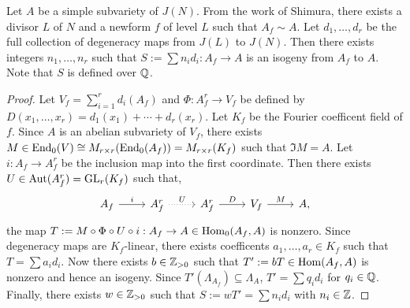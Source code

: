 \documentclass{article}
\begin{document}
\begin{proposition}
    \label{integral_degen}
    Let $A$ be a simple subvariety of $J(N)$. From the work of Shimura,
    there exists a divisor $L$ of $N$ and a newform $f$ of level $L$ such that
    $A_f \sim A$. Let $d_1,\ldots,d_r$ be the full collection of degeneracy
    maps from $J(L)$ to $J(N)$. Then there exists integers $n_1,\ldots,n_r$
    such that $S:=\sum n_i d_i: A_f\to A$ is an isogeny from $A_f$ to $A$. Note
    that $S$ is defined over $\mathbb{Q}$.
\end{proposition}
\begin{proof}
    Let $V_f=\sum_{i=1} ^r d_i(A_f)$ and $\Phi:A_f ^r \to V_f$ be defined by
    $D(x_1,\ldots,x_r) = d_1(x_1)+\cdots+d_r(x_r)$. Let $K_f$ be the Fourier
    coefficent field of $f$. Since $A$ is an abelian subvariety of $V_f$, there
    exists $M\in \operatorname{End}_0(V)\cong M_{r\times r} (\operatorname{End}_0(A_f)) = M_{r\times r}
    (K_f)$ such that $\Im M = A$. Let $i:A_f\to A_f ^r$ be the inclusion map
    into the first coordinate. Then there exists $U\in \operatorname{Aut}(A_f
    ^r)=\operatorname{GL}_r (K_f)$ such that,
    \[
        \begin{tikzcd}
            A_f \arrow[r,"i"] &
            A_f ^r \arrow[r, dotted, "U"] &
            A_f ^r \arrow[r, "D"] &
            V_f \arrow[r, "M"] &
            A,
        \end{tikzcd}
    \]
    the map $T:=M \circ \Phi \circ U\circ i:A_f\to A\in \operatorname{Hom}_0(A_f, A)$ is
    nonzero. Since degeneracy maps are $K_f$-linear, there exists coefficents
    $a_1,\ldots,a_r\in K_f$ such that $T = \sum a_i d_i$. Now there exists
    $b\in \mathbb{Z}_{>0}$ such that $T':=bT\in \operatorname{Hom}(A_f, A)$ is nonzero and hence an
    isogeny. Since $T'(\Lambda_{A_f})\subseteq \Lambda_A$, $T'=\sum q_i d_i$
    for $q_i\in \mathbb{Q}$. Finally, there exists $w\in \mathbb{Z}_{>0}$ such that
    $S:=wT'=\sum n_i d_i$ with $n_i\in \mathbb{Z}$.
\end{proof}
\end{document}
